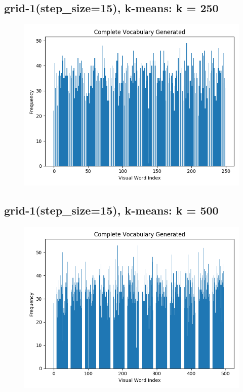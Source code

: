 \subsection*{grid-1(step\_size=15), k-means: k = 250}
\begin{figure}[H]
    \centering
    \includegraphics[scale = 0.5]{images/bow-stp-15-250.png}
\end{figure}

\subsection*{grid-1(step\_size=15), k-means: k = 500}
\begin{figure}[H]
    \centering
    \includegraphics[scale = 0.5]{images/bow-stp-15-500.png}
\end{figure}

